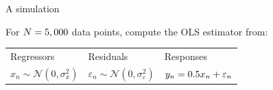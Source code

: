 \begin{frame}{A simulation}

For $N=5,000$ data points, compute the OLS estimator from:

\vspace{1em}
\begin{tabularx}{\textwidth}{YYY}
    Regressors  &   Residuals   &   Responses \\
    $x_n \sim \mathcal{N}(0, \sigma_x^2)$   &
    $\varepsilon_n \sim \mathcal{N}(0, \sigma_\varepsilon^2)$   &
    $y_n = 0.5 x_n + \varepsilon_n$
\end{tabularx}
%

\SimGridNormalGraph{}

\end{frame}







